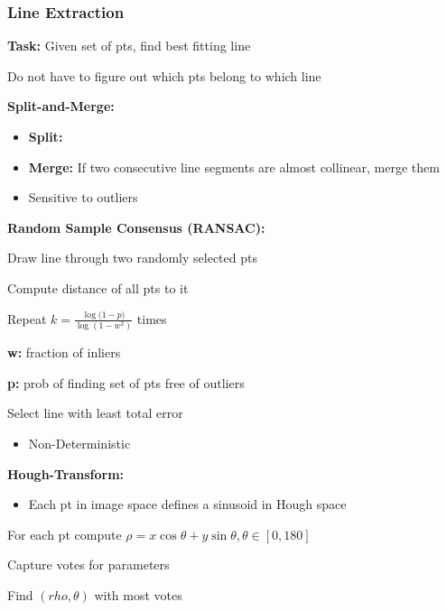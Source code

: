 \documentclass[a4paper]{article}
\newcommand{\icon}{\item[-]}
\newcommand{\ides}[1]{\item \textbf{#1}}
\begin{document}
\subsubsection{Line Extraction}
\begin{itemize}
    \ides{Task:} Given set of pts, find best fitting line
        \begin{itemize*}
            \item Do not have to figure out which pts belong to which line
        \end{itemize*}
    \ides{Split-and-Merge:}
        \begin{itemize}
            \item[1)] \textbf{Split:}
            \item[2)] \textbf{Merge:} If two consecutive line segments are almost collinear, merge them
            \icon Sensitive to outliers
        \end{itemize}
    \ides{Random Sample Consensus (RANSAC):}
        \begin{itemize*}
            \item[1)] Draw line through two randomly selected pts
            \item[2)] Compute distance of all pts to it
            \item[4)] Repeat $k = \frac{\log({1 - p)}}{\log(1 - w^2)}$ times
                \begin{itemize*}
                    \ides{w:} fraction of inliers
                    \ides{p:} prob of finding set of pts free of outliers
                \end{itemize*}
            \item[5)] Select line with least total error
        \end{itemize*}
        \begin{itemize}
            \icon Non-Deterministic
        \end{itemize}
    \ides{Hough-Transform:}
        \begin{itemize}
            \item Each pt in image space defines a sinusoid in Hough space
        \end{itemize}
        \begin{itemize*}
            \item[1)] For each pt compute $\rho = x \cos \theta + y \sin \theta, \theta \in [0, 180]$
            \item[2)] Capture votes for parameters
            \item[3)] Find $(rho, \theta)$ with most votes
        \end{itemize*}
\end{itemize}
\end{document}
